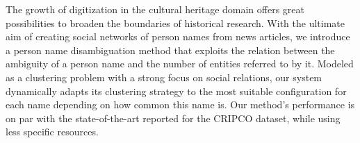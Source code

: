 The growth of digitization in the cultural heritage domain offers great possibilities to broaden the boundaries of historical research. With the ultimate aim of creating social networks of person names from news articles, we introduce a person name disambiguation method that exploits the relation between the ambiguity of a person name and the number of entities referred to by it. Modeled as a clustering problem with a strong focus on social relations, our system dynamically adapts its clustering strategy to the most suitable configuration for each name depending on how common this name is. Our method's performance is on par with the state-of-the-art reported for the CRIPCO dataset, while using less specific resources.

